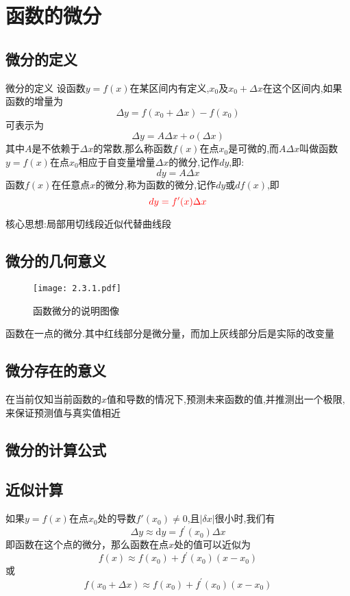 \documentclass[12pt, a4paper, oneside, UTF8]{ctexbook}  %
\begin{document}
%  
\else
\fi
\chapter{函数的微分}

\section{微分的定义}
\begin{defn}{微分的定义}{}
    设函数$y=f(x)$在某区间内有定义,$x_0$及$x_0+\Delta x$在这个区间内,如果函数的增量为
    $$
        \Delta y = f ( x _ { 0 } + \Delta x ) - f ( x _ { 0 } )
    $$
    可表示为
    $$
        \Delta y = A \Delta x + o ( \Delta x )
    $$
    其中$A$是不依赖于$\Delta x$的常数,那么称函数$f(x)$在点$x_0$是可微的,而$A\Delta x$叫做函数$y=f(x)$在点$x_0$相应于自变量增量$\Delta x$​的微分,记作$dy$,即:
    $$
        d y =  A\Delta x
    $$
    函数$f(x)$在任意点$x$的微分,称为函数的微分,记作$dy$或$df(x)$,即
    $$
        \textcolor{red}{d y = f ^ { \prime } ( x ) \Delta x}
    $$
\end{defn}
核心思想:局部用切线段近似代替曲线段
\section{微分的几何意义}
\begin{figure}[H]
    \centering \texttt{[image: 2.3.1.pdf]} \caption{函数微分的说明图像}
\end{figure}
函数在一点的微分.其中红线部分是微分量，而加上灰线部分后是实际的改变量
\section{微分存在的意义}
在当前仅知当前函数的$x$值和导数的情况下,预测未来函数的值,并推测出一个极限,来保证预测值与真实值相近
\section{微分的计算公式}

\section{近似计算}
\begin{defn}{}{}
    如果$y=f(x)$在点$x_0$处的导数$f'(x_0)\neq 0$,且$|\delta x|$很小时,我们有
    $$
        \Delta y\approx\mathrm{d}y=f^{\prime}\left(x_{0}\right)\Delta x
    $$
    即函数在这个点的微分，那么函数在点$x$处的值可以近似为
    $$
        f(x)\approx f(x_{0})+f^{\prime}(x_{0})(x-x_{0})
    $$
    或
    $$
        f(x_0+\Delta x) \approx f(x_{0})+f^{\prime}(x_{0})(x-x_{0})
    $$
\end{defn}
\ifx\allfiles\undefined
\end{document}
